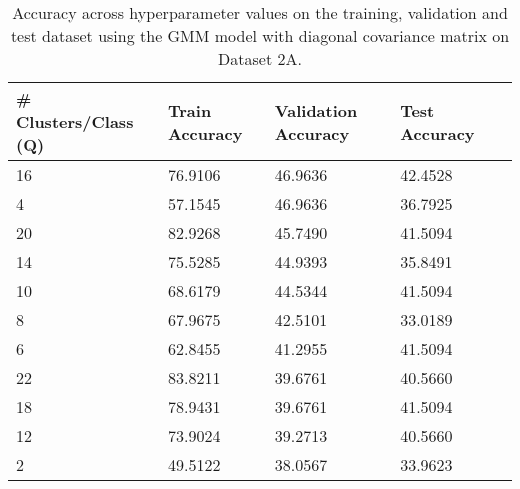 \begin{table}[H]
\centering
\begin{tabular}{l l l l l}
\hline
\hline
\textbf{\# Clusters/Class (Q)} & \textbf{Train Accuracy} & \textbf{Validation Accuracy} & \textbf{Test Accuracy} \\
\hline
\hline
16 & 76.9106 & 46.9636 & 42.4528 \\
4 & 57.1545 & 46.9636 & 36.7925 \\
20 & 82.9268 & 45.7490 & 41.5094 \\
14 & 75.5285 & 44.9393 & 35.8491 \\
10 & 68.6179 & 44.5344 & 41.5094 \\
8 & 67.9675 & 42.5101 & 33.0189 \\
6 & 62.8455 & 41.2955 & 41.5094 \\
22 & 83.8211 & 39.6761 & 40.5660 \\
18 & 78.9431 & 39.6761 & 41.5094 \\
12 & 73.9024 & 39.2713 & 40.5660 \\
2 & 49.5122 & 38.0567 & 33.9623 \\
\hline
\end{tabular}
\caption{Accuracy across hyperparameter values on the training, validation and test dataset using the GMM model with diagonal covariance matrix on Dataset 2A. }
\label{tab:acc2a}
\end{table}

